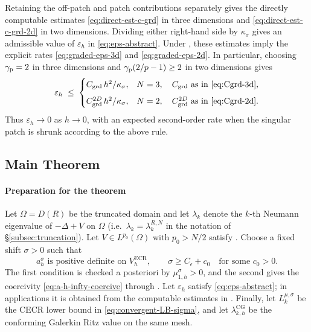 \documentclass[11pt]{article}
\theoremstyle{plain}
\theoremstyle{definition}
\theoremstyle{remark}
\newcommand{\ECR}{\mathrm{ECR}}
\newcommand{\CG}{\mathrm{CG}}
\begin{document}
Retaining the off-patch and patch contributions separately gives the
directly computable estimates \eqref{eq:direct-est-c-grd} in three
dimensions and \eqref{eq:direct-est-c-grd-2d} in two dimensions.
Dividing either right-hand side by $\kappa_\sigma$ gives an admissible
value of $\varepsilon_h$ in \eqref{eq:eps-abstract}.  Under
, these estimates imply the explicit rates
\eqref{eq:graded-eps-3d} and \eqref{eq:graded-eps-2d}.  In particular,
choosing $\gamma_{\rm p}=2$ in three dimensions and
$\gamma_{\rm p}(2/p-1)\ge2$ in two dimensions gives
\begin{equation}
\label{eq:eps-graded-rate}
  \varepsilon_h
  \;\le\;
  \begin{cases}
    C_{\mathrm{grd}}\,h^2/\kappa_\sigma,
      & N=3,\quad C_{\mathrm{grd}}\text{ as in }\eqref{eq:Cgrd-3d},\\[2mm]
    C_{\mathrm{grd}}^{2D}\,h^2/\kappa_\sigma,
      & N=2,\quad C_{\mathrm{grd}}^{2D}\text{ as in }\eqref{eq:Cgrd-2d}.
  \end{cases}
\end{equation}
Thus $\varepsilon_h\to0$ as $h\to0$, with an expected second-order
rate when the singular patch is shrunk according to the above rule.

\subsection{Main Theorem}
\label{subsec:main-theorem}

\paragraph{Preparation for the theorem}
Let $\Omega=D(R)$ be the truncated domain and let $\lambda_k$ denote
the $k$-th Neumann eigenvalue of $-\Delta+V$ on $\Omega$
(i.e.\ $\lambda_k=\lambda_k^{R,N}$ in the notation of
\S\ref{subsec:truncation}).
Let $V \in L^{p_0}(\Omega)$ with $p_0 > N/2$ satisfy
.  Choose a fixed shift $\sigma>0$ such
that
\begin{equation}
\label{eq:main-shift-assumptions}
  a_h^\sigma \text{ is positive definite on } V_h^{\ECR},
  \qquad
  \sigma\ge C_\epsilon+c_0
  \quad\text{for some }c_0>0 .
\end{equation}
The first condition is checked a posteriori by
$\mu_{1,h}^\sigma>0$, and the second gives the coercivity
\eqref{eq:a-h-infty-coercive} through .
Let $\varepsilon_h$ satisfy \eqref{eq:eps-abstract}; in applications it
is obtained from the computable estimates in
.  Finally, let
$L_k^{\mu,\sigma}$ be the CECR lower bound in
\eqref{eq:convergent-LB-sigma}, and let
$\lambda_{k,h}^{\CG}$ be the conforming Galerkin Ritz value on the same
mesh.
\end{document}
